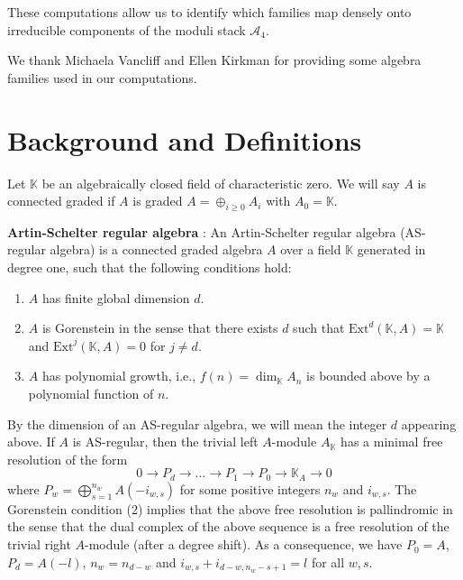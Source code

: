 \documentclass{amsart}
\begin{document}
These computations allow us to identify which families map densely onto irreducible components of the moduli stack $\mathcal{A}_4$. %

We thank Michaela Vancliff and Ellen Kirkman for providing some algebra families used in our computations.

\section{Background and Definitions}
Let $\mathbb{K}$ be an algebraically closed field of characteristic zero.
We will say $A$ is connected graded if $A$ is graded $A = \oplus_{i \geq 0} A_i$ with $A_0=\mathbb{K}.$


\begin{definition}
\textbf{Artin-Schelter regular algebra} \cite{ARTIN1987171}: An Artin-Schelter regular algebra (AS-regular algebra) is a connected graded algebra $A$ over a field $\mathbb{K}$ generated in degree one, such that the following conditions hold:
\begin{enumerate}
    \item $A$ has finite global dimension $d$.
    \item $A$ is Gorenstein in the sense that there exists $d$ such that $\text{Ext}^d(\mathbb{K}, A) = \mathbb{K}$ and $\text{Ext}^j(\mathbb{K}, A) = 0$ for $j \neq d$.
    \item \textnormal{\( A \) has polynomial growth, i.e., \( f(n) = \dim_\mathbb{K} A_n \) is bounded above by a polynomial function of \( n \).}
\end{enumerate}
\end{definition}
By the dimension of an AS-regular algebra, we will mean the integer $d$ appearing above. If $A$ is AS-regular, then the trivial left $A$-module $A_\mathbb{K}$ has a minimal free resolution of the form
\[ 0 \rightarrow P_d \rightarrow \dots \rightarrow P_1 \rightarrow P_0 \rightarrow \mathbb{K}_A \rightarrow 0 \]
where $P_w = \bigoplus_{s=1}^{n_w} A(-i_{w,s})$ for some positive integers $n_w$ and $i_{w,s}$. The Gorenstein condition (2) implies that the above free resolution is pallindromic in the sense that the dual complex of the above sequence is a free resolution of the trivial right $A$-module (after a degree shift). As a consequence, we have $P_0 = A$, $P_d = A(-l)$, $n_w = n_{d-w}$ and $i_{w,s} + i_{d-w,n_w-s+1} = l$ for all $w, s$.

\end{document}
